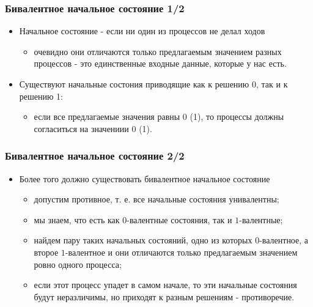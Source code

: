 \begin{frame}
\frametitle{Бивалентное начальное состояние 1/2}
\begin{itemize}
  \item Начальное состояние - если ни один из процессов не делал ходов
  \begin{itemize}
    \item очевидно они отличаются только предлагаемым значением разных
    процессов - это единственные входные данные, которые у нас есть.
  \end{itemize}
  \item Существуют начальные состония приводящие как к решению 0, так и к
  решению 1:
  \begin{itemize}
    \item если все предлагаемые значения равны 0 (1), то процессы должны
    согласиться на значениии 0 (1).
  \end{itemize}
\end{itemize}
\end{frame}

\begin{frame}
\frametitle{Бивалентное начальное состояние 2/2}
\begin{itemize}
  \item Более того должно существовать бивалентное начальное состояние
  \begin{itemize}
    \item допустим противное, т. е. все начальные состояния унивалентны;
    \item мы знаем, что есть как $0$-валентные состояния, так и $1$-валентные;
    \item найдем пару таких начальных состояний, одно из которых $0$-валентное,
    а второе $1$-валентное и они отличаются только предлагаемым значением ровно
    одного процесса;
    \item если этот процесс упадет в самом начале, то эти начальные состояния
    будут неразличимы, но приходят к разным решениям - противоречие.
  \end{itemize}
\end{itemize}
\end{frame}

